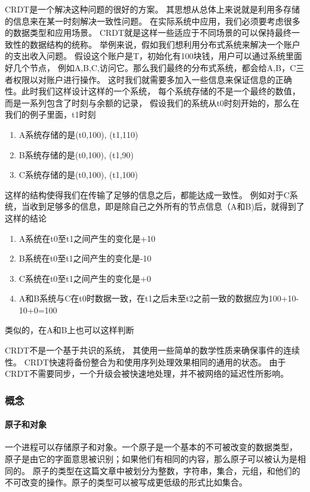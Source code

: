 \documentclass[11pt]{ctexart}
\begin{document}
CRDT是一个解决这种问题的很好的方案。
其思想从总体上来说就是利用多存储的信息来在某一时刻解决一致性问题。
在实际系统中应用，我们必须要考虑很多的数据类型和应用场景。
CRDT就是这样一些适应于不同场景的可以保持最终一致性的数据结构的统称。
举例来说，假如我们想利用分布式系统来解决一个账户的支出收入问题。
假设这个账户是T，初始化有100块钱，用户可以通过系统里面好几个节点，
例如A,B,C,访问它。那么我们最终的分布式系统，都会给A,B，C三者权限以对账户进行操作。
这时我们就需要多加入一些信息来保证信息的正确性。此时我们这样设计这样的一个系统，
每个系统存储的不是一个最终的数值，而是一系列包含了时刻与余额的记录，
假设我们的系统从t0时刻开始的，那么在我们的例子里面，t1时刻
\begin{enumerate}
    \item A系统存储的是(t0,100), (t1,110)
    \item B系统存储的是(t0,100), (t1,90)
    \item C系统存储的是(t0,100), (t1,100)
\end{enumerate}
这样的结构使得我们在传输了足够的信息之后，都能达成一致性。
例如对于C系统，当收到足够多的信息，即是除自己之外所有的节点信息（A和B)后，就得到了这样的结论
\begin{enumerate}
    \item A系统在t0至t1之间产生的变化是+10
    \item B系统在t0至t1之间产生的变化是-10
    \item C系统在t0至t1之间产生的变化是+0
    \item A和B系统与C在t0时数据一致，在t1之后未至t2之前一致的数据应为100+10-10+0=100
\end{enumerate}
类似的，在A和B上也可以这样判断

CRDT不是一个基于共识的系统，
其使用一些简单的数学性质来确保事件的连续性。
CRDT快速将备份整合为和使用序列处理效果相同的通用的状态。
由于CRDT不需要同步，一个升级会被快速地处理，并不被网络的延迟性所影响。

\subsubsection{概念}
\paragraph{原子和对象}
一个进程可以存储原子和对象。一个原子是一个基本的不可被改变的数据类型，
原子是由它的字面意思被识别；如果他们有相同的内容，那么原子可以被认为是相同的。
原子的类型在这篇文章中被划分为整数，字符串，集合，元组，和他们的不可改变的操作。原子的类型可以被写成更低级的形式比如集合。
\end{document}
